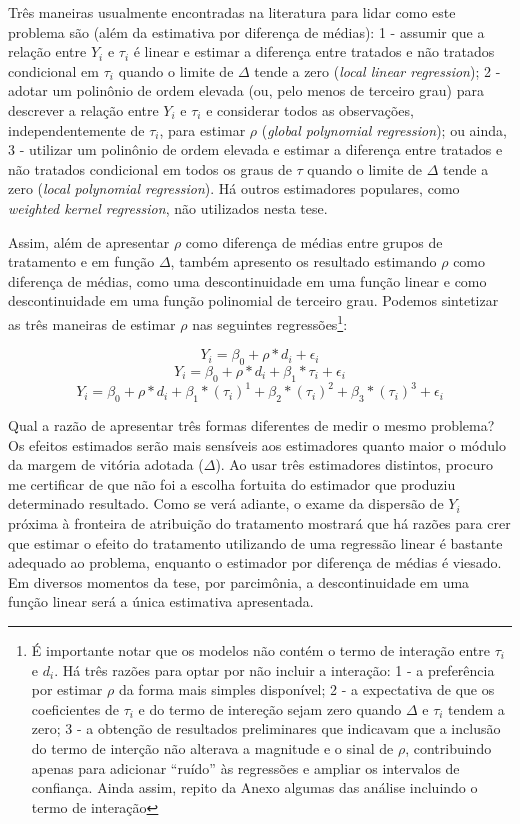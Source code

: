 Três maneiras usualmente encontradas na literatura para lidar como este problema são (além da estimativa por diferença de médias): 1 - assumir que a relação entre $Y_{i}$ e $\tau_{i}$ é linear e estimar a diferença entre tratados e não tratados condicional em $\tau_{i}$ quando o limite de $\Delta$ tende a zero (\emph{local linear regression}); 2 - adotar um polinônio de ordem elevada (ou, pelo menos de terceiro grau) para descrever a relação entre $Y_{i}$ e $\tau_{i}$ e considerar todos as observações, independentemente de $\tau_{i}$, para estimar $\rho$ (\emph{global polynomial regression}); ou ainda, 3 - utilizar um polinônio de ordem elevada e estimar a diferença entre tratados e não tratados condicional em todos os graus de $\tau$ quando o limite de $\Delta$ tende a zero (\emph{local polynomial regression}). Há outros estimadores populares, como \emph{weighted kernel regression}, não utilizados nesta tese.

Assim, além de apresentar $\rho$ como diferença de médias entre grupos de tratamento e em função $\Delta$, também apresento os resultado estimando $\rho$ como diferença de médias, como uma descontinuidade em uma função linear e como descontinuidade em uma função polinomial de terceiro grau. Podemos sintetizar as três maneiras de estimar $\rho$ nas seguintes regressões\footnote{É importante notar que os modelos não contém o termo de interação entre $\tau_{i}$ e $d_{i}$. Há três razões para optar por não incluir a interação: 1 - a preferência por estimar $\rho$ da forma mais simples disponível; 2 - a expectativa de que os coeficientes de $\tau_{i}$ e do termo de intereção sejam zero quando $\Delta$ e $\tau_{i}$ tendem a zero; 3 - a obtenção de resultados preliminares que indicavam que a inclusão do termo de interção não alterava a magnitude e o sinal de $\rho$, contribuindo apenas para adicionar ``ruído'' às regressões e ampliar os intervalos de confiança. Ainda assim, repito da Anexo algumas das análise incluindo o termo de interação}:

\[Y_{i}=\beta_{0}+\rho*d_{i}+\epsilon_{i}\]
\[Y_{i}=\beta_{0}+\rho*d_{i}+\beta_{1}*\tau_{i}+\epsilon_{i}\]
\[Y_{i}=\beta_{0}+\rho*d_{i}+\beta_{1}*(\tau_{i})^1+\beta_{2}*(\tau_{i})^2+\beta_{3}*(\tau_{i})^3+\epsilon_{i}\]

Qual a razão de apresentar três formas diferentes de medir o mesmo problema? Os efeitos estimados serão mais sensíveis aos estimadores quanto maior o módulo da margem de vitória adotada ($\Delta$). Ao usar três estimadores distintos, procuro me certificar de que não foi a escolha fortuita do estimador que produziu determinado resultado. Como se verá adiante, o exame da dispersão de $Y_{i}$ próxima à fronteira de atribuição do tratamento mostrará que há razões para crer que estimar o efeito do tratamento utilizando de uma regressão linear é bastante adequado ao problema, enquanto o estimador por diferença de médias é viesado. Em diversos momentos da tese, por parcimônia, a descontinuidade em uma função linear será a única estimativa apresentada.

